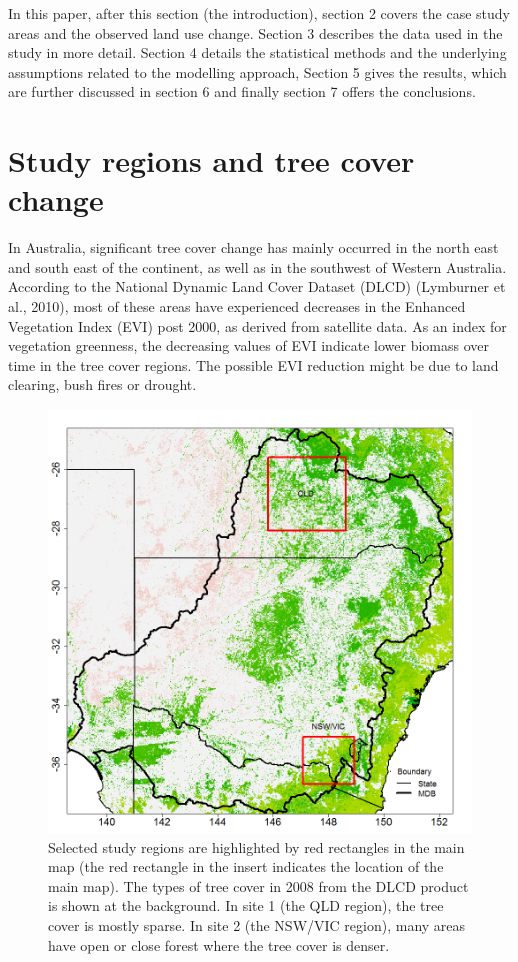 \documentclass[fleqn,10pt,lineno]{wlpeerj} %
\theoremstyle{definition}
\theoremstyle{definition}
\theoremstyle{definition}
\theoremstyle{remark}
\begin{document}
In this paper, after this section (the introduction), section 2 covers
the case study areas and the observed land use change. Section 3
describes the data used in the study in more detail. Section 4 details
the statistical methods and the underlying assumptions related to the
modelling approach, Section 5 gives the results, which are further
discussed in section 6 and finally section 7 offers the conclusions.

\section{Study regions and tree cover
change}\label{study-regions-and-tree-cover-change}

In Australia, significant tree cover change has mainly occurred in the
north east and south east of the continent, as well as in the southwest
of Western Australia. According to the National Dynamic Land Cover
Dataset (DLCD) (Lymburner et al., 2010), most of these areas have
experienced decreases in the Enhanced Vegetation Index (EVI) post 2000,
as derived from satellite data. As an index for vegetation greenness,
the decreasing values of EVI indicate lower biomass over time in the
tree cover regions. The possible EVI reduction might be due to land
clearing, bush fires or drought.

\begin{figure}
\includegraphics[width=0.9\linewidth]{figures/Fig1} \caption{Selected study regions are highlighted by red rectangles in the main map (the red rectangle in the insert indicates the location of the main map). The types of tree cover in 2008 from the DLCD product is shown at the background. In site 1 (the QLD region), the tree cover is mostly sparse. In site 2 (the NSW/VIC region), many areas have open or close forest where the tree cover is denser.}\label{fig:selreg}
\end{figure}
\end{document}
